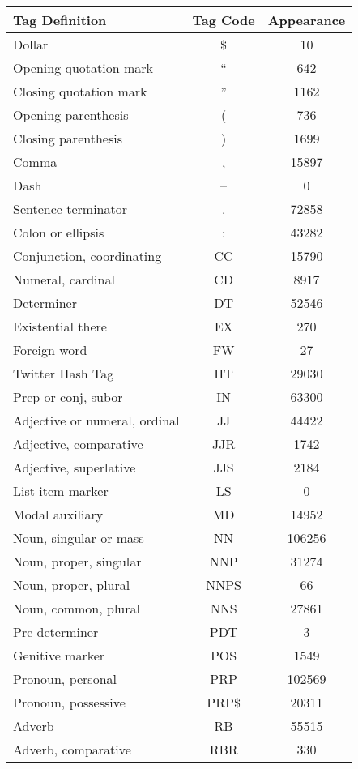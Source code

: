 \documentclass[conference,compsoc]{IEEEtran}
\begin{document}
\begin{center}
	\begin{tabular}{|l|c|c|}
		\hline
			\bf Tag Definition & \bf Tag Code & \bf Appearance \\
		\hline
			Dollar & \$ & 10 \\
			Opening quotation mark & `` & 642 \\
			Closing quotation mark & '' & 1162 \\
			Opening parenthesis & ( & 736 \\
			Closing parenthesis & ) & 1699 \\
			Comma & , & 15897 \\
			Dash & -- & 0 \\
			Sentence terminator & . & 72858 \\
			Colon or ellipsis & : & 43282 \\
			Conjunction, coordinating & CC & 15790 \\
			Numeral, cardinal & CD & 8917 \\
			Determiner & DT & 52546 \\
			Existential there & EX & 270 \\
			Foreign word & FW & 27 \\
			Twitter Hash Tag & HT & 29030 \\
			Prep or conj, subor & IN & 63300 \\
			Adjective or numeral, ordinal & JJ & 44422 \\
			Adjective, comparative & JJR & 1742 \\
			Adjective, superlative & JJS & 2184 \\
			List item marker & LS & 0 \\
			Modal auxiliary & MD & 14952 \\
			Noun, singular or mass & NN & 106256 \\
			Noun, proper, singular & NNP & 31274 \\
			Noun, proper, plural & NNPS & 66 \\
			Noun, common, plural & NNS & 27861 \\
			Pre-determiner & PDT & 3 \\
			Genitive marker & POS & 1549 \\
			Pronoun, personal & PRP & 102569 \\
			Pronoun, possessive & PRP\$ & 20311 \\
			Adverb & RB & 55515 \\
			Adverb, comparative & RBR & 330 \\

\end{tabular}
\end{center}
\end{document}

